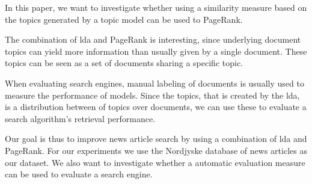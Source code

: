 In this paper, we want to investigate whether using a similarity measure based on the topics generated by a topic model can be used to PageRank.

The combination of \gls{lda} and PageRank is interesting, since underlying document topics can yield more information than usually given by a single document.
These topics can be seen as a set of documents sharing a specific topic. 

When evaluating search engines, manual labeling of documents is usually used to measure the performance of models\cite{yang2009topic}\cite{Tang2008}.
Since the topics, that is created by the \gls{lda}, is a distribution between of topics over documents, we can use these to evaluate a search algorithm's retrieval performance. 

Our goal is thus to improve news article search by using a combination of \gls{lda} and PageRank.
For our experiments we use the Nordjyske database of news articles as our dataset.
We also want to investigate whether a automatic evaluation measure can be used to evaluate a search engine. 




